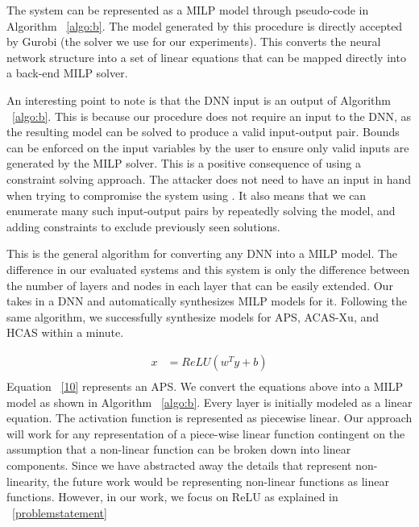 The system can be represented as a MILP model through pseudo-code in Algorithm ~\ref{algo:b}. 
The model generated by this procedure is directly accepted by Gurobi (the solver we use for our experiments).
This converts the neural network structure into a set of linear equations that can be mapped directly into a back-end MILP solver.

An interesting point to note is that the DNN input is an output of Algorithm  ~\ref{algo:b}. 
This is because our procedure does not require an input to the DNN, as the resulting model can be solved to produce a valid input-output pair.
 Bounds can be enforced on the input variables by the user to ensure only
valid inputs are generated by the MILP solver. 
This is a positive consequence of using a constraint solving approach.
 The attacker does not need to have an input in hand when trying to compromise the system using \tool. 
 It also means that we can enumerate many such input-output pairs by repeatedly solving the model,
and adding constraints to exclude previously seen solutions.

This is the general algorithm for converting any \ac{DNN} into a \ac{MILP} model. 
The difference in our evaluated systems and this system is only the difference between the number of layers and nodes in each layer that can be easily extended.
Our \tool  takes in a \ac{DNN} and automatically synthesizes \ac{MILP} models for it. 
Following the same algorithm, we successfully synthesize models for \ac{APS}, \ac{ACAS-Xu}, and \ac{HCAS} within a minute. 

\begin{equation}
\label{10}
\begin{aligned}
x &= ReLU(w^Ty + b) \\
\end{aligned}
\end{equation}
Equation ~\ref{10} represents an \ac{APS}. 
We convert the equations above into a MILP model as shown in Algorithm ~\ref{algo:b}. 
Every layer is initially modeled as a linear equation. 
The activation function is represented as piecewise linear.
Our approach will work for any representation of a piece-wise linear function contingent on the assumption that a non-linear function can be broken down into linear components.
Since we have abstracted away the details that represent non-linearity, the future work would be representing non-linear functions as linear functions. 
 However, in our work, we focus on ReLU as explained in ~\ref{problemstatement}

